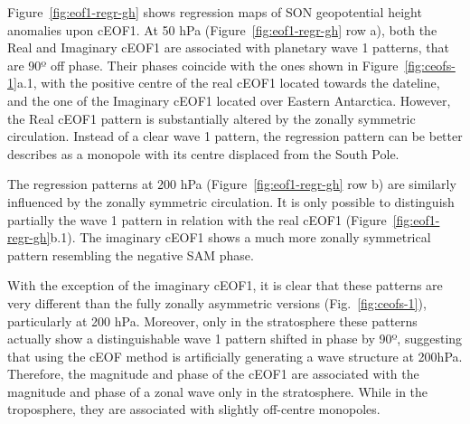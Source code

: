 \documentclass[smallextended]{svjour3}       %
\begin{document}
Figure~\ref{fig:eof1-regr-gh} shows regression maps of SON geopotential height anomalies upon cEOF1.
At 50 hPa (Figure~\ref{fig:eof1-regr-gh} row a), both the Real and Imaginary cEOF1 are associated with planetary wave 1 patterns, that are 90º off phase.
Their phases coincide with the ones shown in Figure~\ref{fig:ceofs-1}a.1, with the positive centre of the real cEOF1 located towards the dateline, and the one of the Imaginary cEOF1 located over Eastern Antarctica.
However, the Real cEOF1 pattern is substantially altered by the zonally symmetric circulation.
Instead of a clear wave 1 pattern, the regression pattern can be better describes as a monopole with its centre displaced from the South Pole.

The regression patterns at 200 hPa (Figure~\ref{fig:eof1-regr-gh} row b) are similarly influenced by the zonally symmetric circulation.
It is only possible to distinguish partially the wave 1 pattern in relation with the real cEOF1 (Figure~\ref{fig:eof1-regr-gh}b.1).
The imaginary cEOF1 shows a much more zonally symmetrical pattern resembling the negative SAM phase.

With the exception of the imaginary cEOF1, it is clear that these patterns are very different than the fully zonally asymmetric versions (Fig.~\ref{fig:ceofs-1}), particularly at 200 hPa.
Moreover, only in the stratosphere these patterns actually show a distinguishable wave 1 pattern shifted in phase by 90º, suggesting that using the cEOF method is artificially generating a wave structure at 200hPa.
Therefore, the magnitude and phase of the cEOF1 are associated with the magnitude and phase of a zonal wave only in the stratosphere.
While in the troposphere, they are associated with slightly off-centre monopoles.
\end{document}
